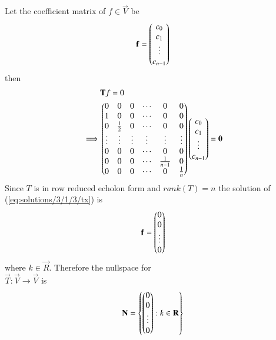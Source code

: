 \begin{enumerate}[label=\emph{\alph*)}]
                Let the coefficient matrix of $f \in \vec{V}$ be
                \begin{align}
                        \mathbf{f}=\begin{pmatrix}c_0\\c_1\\\vdots\\c_{n-1}\end{pmatrix}
                \end{align}
                then
\begin{align}
	&\mathbf{T}f=0 \\
	\implies 
	&\begin{pmatrix}0 & 0 & 0 & \cdots & 0 & 0\\
               1 & 0 & 0 & \cdots & 0 & 0\\
               0 & \frac{1}{2} & 0 & \cdots & 0 & 0\\
               \vdots & \vdots & \vdots & \vdots & \vdots & \vdots\\
               0 & 0 & 0 & \cdots & 0 & 0 \\
               0 & 0 & 0 & \cdots & \frac{1}{n-1} & 0 \\
               0 & 0 & 0 & \cdots & 0 & \frac{1}{n} \end{pmatrix}
	       \begin{pmatrix}c_0\\c_1\\\vdots\\c_{n-1}\end{pmatrix}=\mathbf{0} \label{eq:solutions/3/1/3/tx}
\end{align}
Since $T$ is in row reduced echolon form and $rank(T)=n$ the solution of (\ref{eq:solutions/3/1/3/tx}) is
\begin{align}
\mathbf{f}=\begin{pmatrix}0\\0\\\vdots\\0\end{pmatrix}
\end{align}
where $k \in \vec{R}$. Therefore the nullspace for \\$\vec{T}:\vec{V}\rightarrow\vec{V}$ is
\begin{align}
        \mathbf{N}=\left\{\begin{pmatrix}0\\0\\\vdots\\0\end{pmatrix}:k \in \mathbf{R}\right\}
\end{align}
\end{enumerate}
